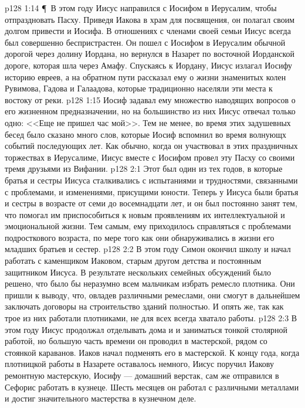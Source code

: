 \vs p128 1:14 \P\ В этом году Иисус направился с Иосифом в Иерусалим, чтобы отпраздновать Пасху. Приведя Иакова в храм для посвящения, он полагал своим долгом привести и Иосифа. В отношениях с членами своей семьи Иисус всегда был совершенно беспристрастен. Он пошел с Иосифом в Иерусалим обычной дорогой через долину Иордана, но вернулся в Назарет по восточной Иорданской дороге, которая шла через Амафу. Спускаясь к Иордану, Иисус излагал Иосифу историю евреев, а на обратном пути рассказал ему о жизни знаменитых колен Рувимова, Гадова и Галаадова, которые традиционно населяли эти места к востоку от реки.
\vs p128 1:15 Иосиф задавал ему множество наводящих вопросов о его жизненном предназначении, но на большинство из них Иисус отвечал только одно: <<Еще не пришел час мой>>. Тем не менее, во время этих задушевных бесед было сказано много слов, которые Иосиф вспомнил во время волнующх событий последующих лет. Как обычно, когда он участвовал в этих праздничных торжествах в Иерусалиме, Иисус вместе с Иосифом провел эту Пасху со своими тремя друзьями из Вифании.
\vs p128 2:1 Этот был один из тех годов, в которые братья и сестры Иисуса сталкивались с испытаниями и трудностями, связанными с проблемами, и изменениями, присущими юности. Теперь у Иисуса были братья и сестры в возрасте от семи до восемнадцати лет, и он был постоянно занят тем, что помогал им приспособиться к новым проявлениям их интеллектуальной и эмоциональной жизни. Тем самым, ему приходилось справляться с проблемами подросткового возраста, по мере того как они обнаруживались в жизни его младших братьев и сестер.
\vs p128 2:2 В этом году Симон окончил школу и начал работать с каменщиком Иаковом, старым другом детства и постоянным защитником Иисуса. В результате нескольких семейных обсуждений было решено, что было бы неразумно всем мальчикам избрать ремесло плотника. Они пришли к выводу, что, овладев различными ремеслами, они смогут в дальнейшем заключать договоры на строительство зданий полностью. И опять же, так как трое из них работали плотниками, не для всех всегда хватало работы.
\vs p128 2:3 В этом году Иисус продолжал отделывать дома и и заниматься тонкой столярной работой, но большую часть времени он проводил в мастерской, рядом со стоянкой караванов. Иаков начал подменять его в мастерской. К концу года, когда плотницкой работы в Назарете оставалось немного, Иисус поручил Иакову ремонтную мастерскую, Иосифу --- домашний верстак, сам же отправился в Сефорис работать в кузнеце. Шесть месяцев он работал с различными металлами и достиг значительного мастерства в кузнечном деле.
